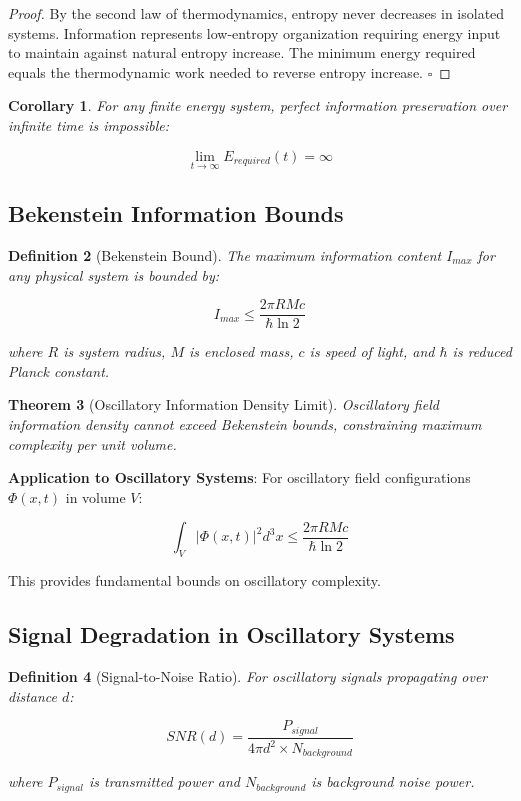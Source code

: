 \documentclass[11pt]{article}
\newtheorem{theorem}{Theorem}[section]
\newtheorem{corollary}[theorem]{Corollary}
\newtheorem{definition}[theorem]{Definition}
\theoremstyle{remark}
\begin{document}
\begin{proof}
By the second law of thermodynamics, entropy never decreases in isolated systems. Information represents low-entropy organization requiring energy input to maintain against natural entropy increase. The minimum energy required equals the thermodynamic work needed to reverse entropy increase. $\square$
\end{proof}

\begin{corollary}
For any finite energy system, perfect information preservation over infinite time is impossible:

$$\lim_{t \to \infty} E_{required}(t) = \infty$$
\end{corollary}

\subsection{Bekenstein Information Bounds}

\begin{definition}[Bekenstein Bound]
The maximum information content $I_{max}$ for any physical system is bounded by:

$$I_{max} \leq \frac{2\pi RM c}{\hbar \ln 2}$$

where $R$ is system radius, $M$ is enclosed mass, $c$ is speed of light, and $\hbar$ is reduced Planck constant.
\end{definition}

\begin{theorem}[Oscillatory Information Density Limit]
Oscillatory field information density cannot exceed Bekenstein bounds, constraining maximum complexity per unit volume.
\end{theorem}

\textbf{Application to Oscillatory Systems}: For oscillatory field configurations $\Phi(x,t)$ in volume $V$:

$$\int_V |\Phi(x,t)|^2 d^3x \leq \frac{2\pi R M c}{\hbar \ln 2}$$

This provides fundamental bounds on oscillatory complexity.

\subsection{Signal Degradation in Oscillatory Systems}

\begin{definition}[Signal-to-Noise Ratio]
For oscillatory signals propagating over distance $d$:

$$SNR(d) = \frac{P_{signal}}{4\pi d^2 \times N_{background}}$$

where $P_{signal}$ is transmitted power and $N_{background}$ is background noise power.
\end{definition}
\end{document}

